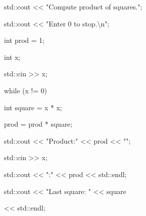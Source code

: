 
\begin{console}

std::cout << "Compute product of squares.";

std::cout << "Enter 0 to stop.\textbackslash n";



int prod = 1;

int x;

std::cin >> x;

while (x != 0)

{     

     int square = x * x;

     prod = prod * square;

     std::cout << "Product:" << prod << "\n";

     std::cin >> x;

}



std::cout << "\nProduct:" << prod << std::endl;

std::cout << "Last square: " << square

          << std::endl;

\end{console}

